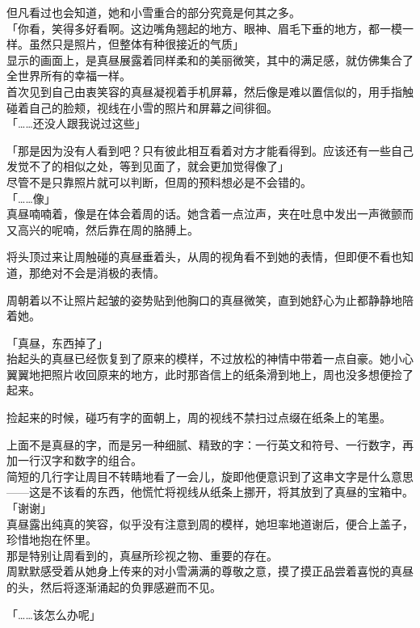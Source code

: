 但凡看过也会知道，她和小雪重合的部分究竟是何其之多。\\

「你看，笑得多好看啊。这边嘴角翘起的地方、眼神、眉毛下垂的地方，都一模一样。虽然只是照片，但整体有种很接近的气质」\\

显示的画面上，是真昼展露着同样柔和的美丽微笑，其中的满足感，就仿佛集合了全世界所有的幸福一样。\\

首次见到自己由衷笑容的真昼凝视着手机屏幕，然后像是难以置信似的，用手指触碰着自己的脸颊，视线在小雪的照片和屏幕之间徘徊。\\

「……还没人跟我说过这些」

「那是因为没有人看到吧？只有彼此相互看着对方才能看得到。应该还有一些自己发觉不了的相似之处，等到见面了，就会更加觉得像了」\\

尽管不是只靠照片就可以判断，但周的预料想必是不会错的。\\

「……像」\\

真昼喃喃着，像是在体会着周的话。她含着一点泣声，夹在吐息中发出一声微颤而又高兴的呢喃，然后靠在周的胳膊上。

将头顶过来让周触碰的真昼垂着头，从周的视角看不到她的表情，但即便不看也知道，那绝对不会是消极的表情。

周朝着以不让照片起皱的姿势贴到他胸口的真昼微笑，直到她舒心为止都静静地陪着她。\\

\vspace{2\baselineskip}

「真昼，东西掉了」\\

抬起头的真昼已经恢复到了原来的模样，不过放松的神情中带着一点自豪。她小心翼翼地把照片收回原来的地方，此时那沓信上的纸条滑到地上，周也没多想便捡了起来。

捡起来的时候，碰巧有字的面朝上，周的视线不禁扫过点缀在纸条上的笔墨。

上面不是真昼的字，而是另一种细腻、精致的字：一行英文和符号、一行数字，再加一行汉字和数字的组合。\\

简短的几行字让周目不转睛地看了一会儿，旋即他便意识到了这串文字是什么意思——这是不该看的东西，他慌忙将视线从纸条上挪开，将其放到了真昼的宝箱中。\\

「谢谢」\\

真昼露出纯真的笑容，似乎没有注意到周的模样，她坦率地道谢后，便合上盖子，珍惜地抱在怀里。\\

那是特别让周看到的，真昼所珍视之物、重要的存在。\\

周默默感受着从她身上传来的对小雪满满的尊敬之意，摸了摸正品尝着喜悦的真昼的头，然后将逐渐涌起的负罪感避而不见。\\

\vspace{2\baselineskip}

「……该怎么办呢」
